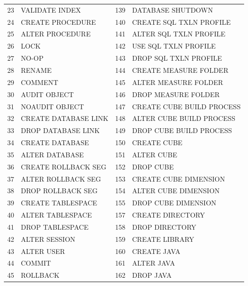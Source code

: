 \begin{appendix}
\begin{longtable}[]{@{}rl|rl@{}}
23   & VALIDATE INDEX               & 139 & DATABASE SHUTDOWN            \\
24   & CREATE PROCEDURE             & 140 & CREATE SQL TXLN PROFILE      \\
25   & ALTER PROCEDURE              & 141 & ALTER SQL TXLN PROFILE       \\
26   & LOCK                         & 142 & USE SQL TXLN PROFILE         \\
27   & NO-OP                        & 143 & DROP SQL TXLN PROFILE        \\
28   & RENAME                       & 144 & CREATE MEASURE FOLDER        \\
29   & COMMENT                      & 145 & ALTER MEASURE FOLDER         \\
30   & AUDIT OBJECT                 & 146 & DROP MEASURE FOLDER          \\
31   & NOAUDIT OBJECT               & 147 & CREATE CUBE BUILD PROCESS    \\
32   & CREATE DATABASE LINK         & 148 & ALTER CUBE BUILD PROCESS     \\
33   & DROP DATABASE LINK           & 149 & DROP CUBE BUILD PROCESS      \\
34   & CREATE DATABASE              & 150 & CREATE CUBE                  \\
35   & ALTER DATABASE               & 151 & ALTER CUBE                   \\
36   & CREATE ROLLBACK SEG          & 152 & DROP CUBE                    \\  
37   & ALTER ROLLBACK SEG           & 153 & CREATE CUBE DIMENSION        \\
38   & DROP ROLLBACK SEG            & 154 & ALTER CUBE DIMENSION         \\
39   & CREATE TABLESPACE            & 155 & DROP CUBE DIMENSION          \\
40   & ALTER TABLESPACE             & 157 & CREATE DIRECTORY             \\
41   & DROP TABLESPACE              & 158 & DROP DIRECTORY               \\
42   & ALTER SESSION                & 159 & CREATE LIBRARY               \\
43   & ALTER USER                   & 160 & CREATE JAVA                  \\
44   & COMMIT                       & 161 & ALTER JAVA                   \\
45   & ROLLBACK                     & 162 & DROP JAVA                    \\

\end{longtable}
\end{appendix}
